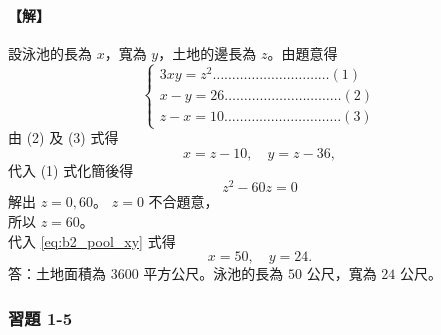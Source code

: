 \paragraph{【解】}
設泳池的長為 $x$，寬為 $y$，土地的邊長為 $z$。由題意得
\[
\begin{cases}
3xy = z^2 \dots\dots\dots\dots\dots\dots\dots\dots\dots\dots (1) \\
x-y = 26 \dots\dots\dots\dots\dots\dots\dots\dots\dots\dots (2) \\
z-x = 10 \dots\dots\dots\dots\dots\dots\dots\dots\dots\dots (3)
\end{cases}
\]
由 (2) 及 (3) 式得
\begin{equation}\label{eq:b2_pool_xy}\tag{4}
x = z-10,\quad y = z-36,
\end{equation}
代入 (1) 式化簡後得
\[
z^2-60z = 0
\]
解出 $z = 0, 60$。 $z=0$ 不合題意，\\
所以 $z=60$。\\
代入 \eqref{eq:b2_pool_xy} 式得
\[
x=50,\quad y=24.
\]
答：土地面積為 $3600$ 平方公尺。泳池的長為 $50$ 公尺，寬為 $24$ 公尺。


\subsubsection*{習題 1-5}\label{sec:b2_ex1-5}

